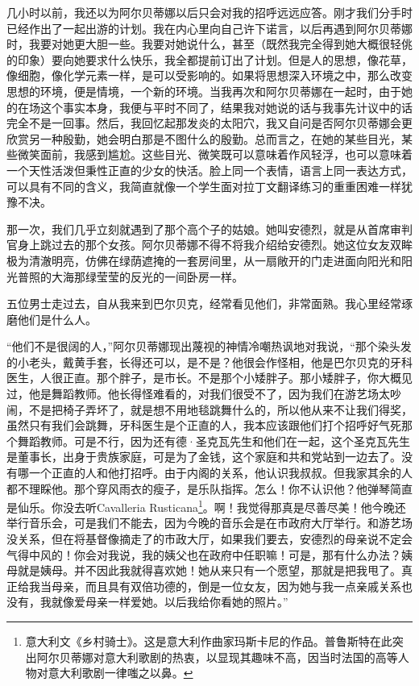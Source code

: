 \par 几小时以前，我还以为阿尔贝蒂娜以后只会对我的招呼远远应答。刚才我们分手时已经作出了一起出游的计划。我在内心里向自己许下诺言，以后再遇到阿尔贝蒂娜时，我要对她更大胆一些。我要对她说什么，甚至（既然我完全得到她大概很轻佻的印象）要向她要求什么快乐，我全都提前订出了计划。但是人的思想，像花草，像细胞，像化学元素一样，是可以受影响的。如果将思想深入环境之中，那么改变思想的环境，便是情境，一个新的环境。当我再次和阿尔贝蒂娜在一起时，由于她的在场这个事实本身，我便与平时不同了，结果我对她说的话与我事先计议中的话完全不是一回事。然后，我回忆起那发炎的太阳穴，我又自问是否阿尔贝蒂娜会更欣赏另一种殷勤，她会明白那是不图什么的殷勤。总而言之，在她的某些目光，某些微笑面前，我感到尴尬。这些目光、微笑既可以意味着作风轻浮，也可以意味着一个天性活泼但秉性正直的少女的快活。脸上同一个表情，语言上同一表达方式，可以具有不同的含义，我简直就像一个学生面对拉丁文翻译练习的重重困难一样犹豫不决。
\par 那一次，我们几乎立刻就遇到了那个高个子的姑娘。她叫安德烈，就是从首席审判官身上跳过去的那个女孩。阿尔贝蒂娜不得不将我介绍给安德烈。她这位女友双眸极为清澈明亮，仿佛在绿荫遮掩的一套房间里，从一扇敞开的门走进面向阳光和阳光普照的大海那绿莹莹的反光的一间卧房一样。
\par 五位男士走过去，自从我来到巴尔贝克，经常看见他们，非常面熟。我心里经常琢磨他们是什么人。
\par “他们不是很阔的人，”阿尔贝蒂娜现出蔑视的神情冷嘲热讽地对我说，“那个染头发的小老头，戴黄手套，长得还可以，是不是？他很会作怪相，他是巴尔贝克的牙科医生，人很正直。那个胖子，是市长。不是那个小矮胖子。那小矮胖子，你大概见过，他是舞蹈教师。他长得怪难看的，对我们很受不了，因为我们在游艺场太吵闹，不是把椅子弄坏了，就是想不用地毯跳舞什么的，所以他从来不让我们得奖，虽然只有我们会跳舞，牙科医生是个正直的人，我本应该跟他们打个招呼好气死那个舞蹈教师。可是不行，因为还有德·圣克瓦先生和他们在一起，这个圣克瓦先生是董事长，出身于贵族家庭，可是为了金钱，这个家庭和共和党站到一边去了。没有哪一个正直的人和他打招呼。由于内阁的关系，他认识我叔叔。但我家其余的人都不理睬他。那个穿风雨衣的瘦子，是乐队指挥。怎么！你不认识他？他弹琴简直是仙乐。你没去听Cavalleria Rusticana\footnote{意大利文《乡村骑士》。这是意大利作曲家玛斯卡尼的作品。普鲁斯特在此突出阿尔贝蒂娜对意大利歌剧的热衷，以显现其趣味不高，因当时法国的高等人物对意大利歌剧一律嗤之以鼻。}。啊！我觉得那真是尽善尽美！他今晚还举行音乐会，可是我们不能去，因为今晚的音乐会是在市政府大厅举行。和游艺场没关系，但在将基督像摘走了的市政大厅，如果我们要去，安德烈的母亲说不定会气得中风的！你会对我说，我的姨父也在政府中任职嘛！可是，那有什么办法？姨母就是姨母。并不因此我就得喜欢她！她从来只有一个愿望，那就是把我甩了。真正给我当母亲，而且具有双倍功德的，倒是一位女友，因为她与我一点亲戚关系也没有，我就像爱母亲一样爱她。以后我给你看她的照片。”
